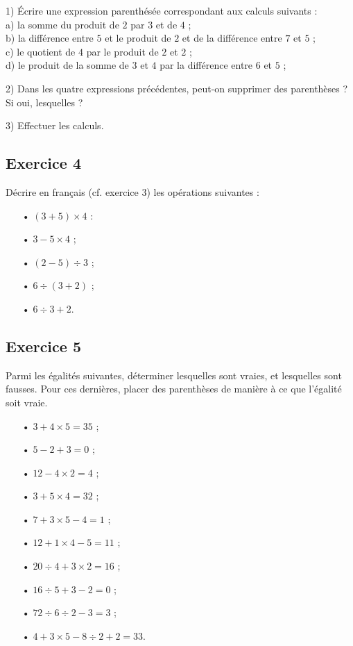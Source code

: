 \documentclass[12 pt]{extarticle}
\theoremstyle{plain}
\begin{document}
1) Écrire une expression parenthésée correspondant aux calculs suivants : \\
a) la somme du produit de $2$ par $3$ et de $4$ ;\\
b) la différence entre $5$ et le produit de $2$ et de la différence entre $7$ et  $5$ ; \\
c) le quotient de $4$ par le produit de $2$ et $2$ ; \\
d) le produit de la somme de $3$ et $4$ par la différence entre $6$ et $5$ ;
 
2) Dans les quatre expressions précédentes, peut-on supprimer des parenthèses ? Si oui, lesquelles ? 

3) Effectuer les calculs. 
 \newpage
\subsection*{Exercice 4}
Décrire en français (cf. exercice 3) les opérations suivantes : 
\begin{itemize}
\item[•] $(3 + 5)\times 4 $ :
\item[•] $ 3 - 5 \times 4$ ; 
\item[•] $  (2 - 5) \div 3 $ ;
\item[•] $ 6\div (3+2)$ ;
\item[•] $ 6\div 3+2$.
\end{itemize}
\subsection*{Exercice 5}

Parmi les égalités suivantes, déterminer lesquelles sont vraies, et lesquelles sont fausses. Pour ces dernières, placer des parenthèses de manière à ce que l'égalité soit vraie. 
\begin{itemize}
\item[•] $ 3 + 4 \times 5 = 35$ ;
\item[•] $ 5 - 2 + 3 = 0$ ;
\item[•] $ 12 - 4 \times 2 = 4 $ ;
\item[•] $ 3 + 5 \times 4 = 32$ ;
\item[•] $ 7 + 3 \times 5 -4 = 1$ ;
\item[•] $ 12 + 1\times 4 - 5 = 11$ ;
\item[•] $ 20 \div 4 + 3 \times 2 = 16$ ; 
\item[•] $ 16 \div 5 + 3 - 2 = 0$ ;
\item[•] $ 72 \div 6 \div 2 - 3 = 3 $ ;
\item[•] $ 4 + 3 \times 5 - 8 \div 2 + 2 = 33$.
\end{itemize}
\end{document}
